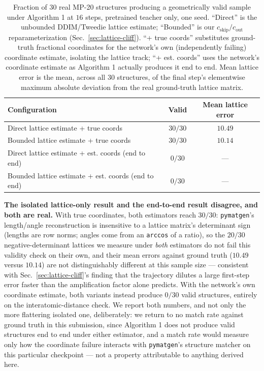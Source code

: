 \documentclass{article}
\begin{document}
\begin{table}[t]
  \centering
  \caption{Fraction of $30$ real MP-20 structures producing a geometrically valid sample under Algorithm 1 at $16$ steps, pretrained teacher only, one seed. ``Direct'' is the unbounded DDIM/Tweedie lattice estimate; ``Bounded'' is our $c_{\text{skip}}/c_{\text{out}}$ reparameterization (Sec.~\ref{sec:lattice-cliff}). ``+ true coords'' substitutes ground-truth fractional coordinates for the network's own (independently failing) coordinate estimate, isolating the lattice track; ``+ est. coords'' uses the network's coordinate estimate as Algorithm 1 actually produces it end to end. Mean lattice error is the mean, across all $30$ structures, of the final step's elementwise maximum absolute deviation from the real ground-truth lattice matrix.}
  \label{tab:main}
  \begin{tabular}{lcc}
    \toprule
    Configuration & Valid & Mean lattice error \\
    \midrule
    Direct lattice estimate + true coords & $30/30$ & $10.49$ \\
    Bounded lattice estimate + true coords & $30/30$ & $10.14$ \\
    Direct lattice estimate + est. coords (end to end) & $0/30$ & --- \\
    Bounded lattice estimate + est. coords (end to end) & $0/30$ & --- \\
    \bottomrule
  \end{tabular}
\end{table}

\textbf{The isolated lattice-only result and the end-to-end result disagree, and both are real.} With true coordinates, both estimators reach $30/30$: \texttt{pymatgen}'s length/angle reconstruction is insensitive to a lattice matrix's determinant sign (lengths are row norms; angles come from an \texttt{arccos} of a ratio), so the $20/30$ negative-determinant lattices we measure under \emph{both} estimators do not fail this validity check on their own, and their mean errors against ground truth ($10.49$ versus $10.14$) are not distinguishably different at this sample size --- consistent with Sec.~\ref{sec:lattice-cliff}'s finding that the trajectory dilutes a large first-step error faster than the amplification factor alone predicts. With the network's own coordinate estimate, both variants instead produce $0/30$ valid structures, entirely on the interatomic-distance check. We report both numbers, and not only the more flattering isolated one, deliberately: we return to no match rate against ground truth in this submission, since Algorithm 1 does not produce valid structures end to end under either estimator, and a match rate would measure only how the coordinate failure interacts with \texttt{pymatgen}'s structure matcher on this particular checkpoint --- not a property attributable to anything derived here.
\end{document}
